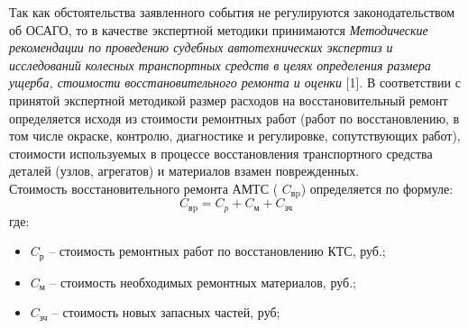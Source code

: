 %
%
\par  Так как обстоятельства заявленного события не регулируются законодательством об ОСАГО, то в качестве экспертной методики принимаются \emph{Методические рекомендации по проведению судебных автотехнических экспертиз и исследований колесных транспортных средств в целях определения размера ущерба, стоимости восстановительного ремонта и оценки} [1].
В соответствии с принятой экспертной методикой размер расходов на восстановительный ремонт определяется исходя из стоимости ремонтных работ (работ по восстановлению, в том числе окраске, контролю, диагностике и регулировке, сопутствующих работ), стоимости используемых в процессе восстановления транспортного средства деталей (узлов, агрегатов) и материалов взамен поврежденных.\\
%                                         
Стоимость восстановительного ремонта АМТС ( $ C_\text{вp} $) определяется по формуле:
%
\begin{equation}\label{eq:r}
C_\text{вp} =C_p + C_\text{м} + C_\text{зч}
\end{equation}
%
\noindent где:
%
\begin{itemize}
%	
\item[ ]$C_\text {р} $ --  стоимость ремонтных работ по восстановлению КТС, руб.;
\item[ ]$ C_\text{м} $ --  стоимость необходимых ремонтных материалов, руб.;
\item[ ]$ C_\text{зч} $ --  стоимость новых запасных частей, руб;
\end{itemize}
%
\vspace{5mm}
\renewcommand\baselinestretch{1.2}\small\normalsize
%
%
%
